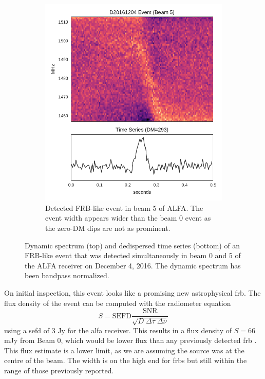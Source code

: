 \documentclass[a4paper,fleqn,usenatbib]{mnras}
\begin{document}
\begin{figure}
\begin{subfigure}[t]{0.45\textwidth}
        \includegraphics[width=1.0\textwidth]{figures/D20161204_buf4_Beam5.pdf}
        \caption{Detected FRB-like event in beam 5 of ALFA. The event width
        appears wider than the beam 0 event as the zero-DM dips are not as
        prominent.
        }
        \label{fig:beam5_dynamic_spec}
    \end{subfigure}
    \caption{
    Dynamic spectrum (top) and dedispersed time series (bottom) of an FRB-like
    event that was detected simultaneously in beam 0 and 5 of the ALFA receiver
    on December 4, 2016. The dynamic spectrum has been bandpass normalized.
    }
    \label{fig:dynamic_spec}
\end{figure}

On initial inspection, this event looks like a promising new astrophysical
\gls{frb}. The flux density of the event can be computed with the radiometer
equation
%
$$
S = \textrm{SEFD} \frac{\textrm{SNR}}{\sqrt{D \; \Delta \tau \;
\Delta \nu}}
$$
%
using a \gls{sefd} of 3 Jy for the \gls{alfa} receiver. This results in a flux
density of $S = 66$ mJy from Beam 0, which would be lower flux than any
previously detected \gls{frb} \citep{2016PASA...33...45P}. This flux estimate is
a lower limit, as we are assuming the source was at the centre of the beam. The
width is on the high end for \glspl{frb} but still within the range of those
previously reported.
\end{document}
